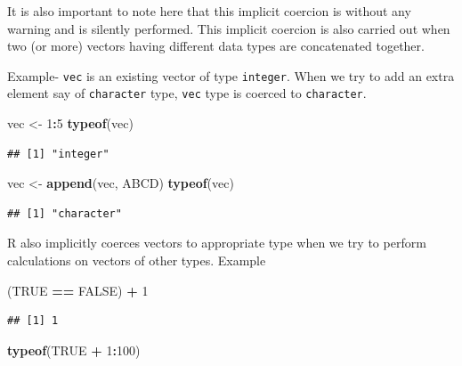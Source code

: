 \documentclass[
]{book}
\newenvironment{Shaded}{\begin{snugshade}}{\end{snugshade}}
\newcommand{\ConstantTok}[1]{\textcolor[rgb]{0.56,0.35,0.01}{#1}}
\newcommand{\DecValTok}[1]{\textcolor[rgb]{0.00,0.00,0.81}{#1}}
\newcommand{\FunctionTok}[1]{\textcolor[rgb]{0.13,0.29,0.53}{\textbf{#1}}}
\newcommand{\NormalTok}[1]{#1}
\newcommand{\OtherTok}[1]{\textcolor[rgb]{0.56,0.35,0.01}{#1}}
\newcommand{\SpecialCharTok}[1]{\textcolor[rgb]{0.81,0.36,0.00}{\textbf{#1}}}
\newcommand{\StringTok}[1]{\textcolor[rgb]{0.31,0.60,0.02}{#1}}
\begin{document}
It is also important to note here that this implicit coercion is without any warning and is silently performed. This implicit coercion is also carried out when two (or more) vectors having different data types are concatenated together.

Example- \texttt{vec} is an existing vector of type \texttt{integer}. When we try to add an extra element say of \texttt{character} type, \texttt{vec} type is coerced to \texttt{character}.

\begin{Shaded}
\begin{Highlighting}[]
\NormalTok{vec }\OtherTok{\textless{}{-}} \DecValTok{1}\SpecialCharTok{:}\DecValTok{5}
\FunctionTok{typeof}\NormalTok{(vec)}
\end{Highlighting}
\end{Shaded}

\begin{verbatim}
## [1] "integer"
\end{verbatim}

\begin{Shaded}
\begin{Highlighting}[]
\NormalTok{vec }\OtherTok{\textless{}{-}} \FunctionTok{append}\NormalTok{(vec, }\StringTok{\textquotesingle{}ABCD\textquotesingle{}}\NormalTok{)}
\FunctionTok{typeof}\NormalTok{(vec)}
\end{Highlighting}
\end{Shaded}

\begin{verbatim}
## [1] "character"
\end{verbatim}

R also implicitly coerces vectors to appropriate type when we try to perform calculations on vectors of other types. Example

\begin{Shaded}
\begin{Highlighting}[]
\NormalTok{(}\ConstantTok{TRUE} \SpecialCharTok{==} \ConstantTok{FALSE}\NormalTok{) }\SpecialCharTok{+} \DecValTok{1}
\end{Highlighting}
\end{Shaded}

\begin{verbatim}
## [1] 1
\end{verbatim}

\begin{Shaded}
\begin{Highlighting}[]
\FunctionTok{typeof}\NormalTok{(}\ConstantTok{TRUE} \SpecialCharTok{+} \DecValTok{1}\SpecialCharTok{:}\DecValTok{100}\NormalTok{)}
\end{Highlighting}
\end{Shaded}
\end{document}
